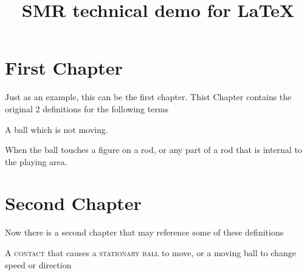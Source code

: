\documentclass[fontsize=11pt, paper=a4]{report}
\newcommand{\refformat}[1]{{\textsc{#1}}} %
\newcommand{\defformat}[1]{{\textbf{\refformat{#1}}}}%
\newcommand{\tterm}[2]{
\begin{Definition}[name=\defformat{#1}]
	#2
\end{Definition}
}
\newcommand{\tref}[1]{\refformat{#1}}
\begin{document}
\title{SMR technical demo for \LaTeX}
\maketitle

\listoftheorems
\pagestyle{plain}%
\chapter*{First Chapter}
Just as an example, this can be the first chapter. Thist Chapter contains the original 2 definitions for the following terms
\tterm{stationary ball}{A ball which is not moving.}
\tterm{contact}{When the ball touches a figure on a rod, or any part of a rod that is internal to the playing
area.}

\newpage
\chapter*{Second Chapter}
Now there is a second chapter that may reference some of these definitions
\tterm{move}{A \tref{contact} that causes a \tref{stationary ball} to move, or a moving ball to change speed or direction}



\end{document}
